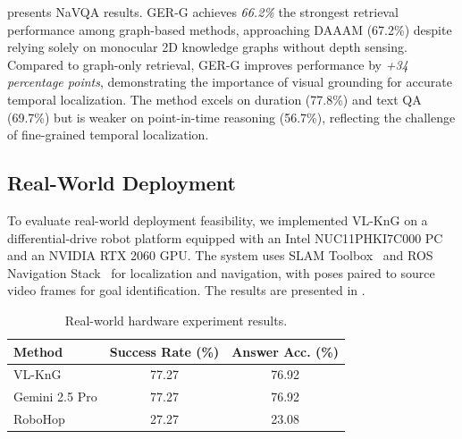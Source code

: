  presents NaVQA results.
GER-G achieves \textit{66.2\%} the strongest retrieval performance among graph-based methods, approaching DAAAM (67.2\%) despite relying solely on monocular 2D knowledge graphs without depth sensing. Compared to graph-only retrieval, GER-G improves performance by \textit{+34 percentage points}, demonstrating the importance of visual grounding for accurate temporal localization.
The method excels on duration (77.8\%) and text QA (69.7\%) but is weaker on point-in-time reasoning (56.7\%), reflecting the challenge of fine-grained temporal localization.


\subsection{Real-World Deployment}
To evaluate real-world deployment feasibility, we implemented VL-KnG on a differential-drive robot platform equipped with an Intel NUC11PHKI7C000 PC and an NVIDIA RTX 2060 GPU. The system uses SLAM Toolbox~\cite{macenski2021slam} and ROS Navigation Stack~\cite{guimaraes2016ros} for localization and navigation, with poses paired to source video frames for goal identification.
The results are presented in .

\begin{table}[!h]
\centering
\caption{Real-world hardware experiment results.}
\label{tab:hardware_results}
\scriptsize
\setlength{\tabcolsep}{1.5pt}
\begin{tabular}{lcc}
\toprule
\textbf{Method} & \textbf{Success Rate (\%)} & \textbf{Answer Acc. (\%)} \\
\midrule
VL-KnG & 77.27 & 76.92 \\
Gemini 2.5 Pro & 77.27 & 76.92 \\
RoboHop & 27.27 & 23.08 \\
\bottomrule
\end{tabular}
\end{table}

